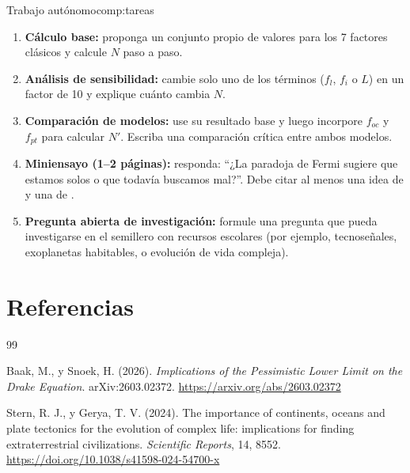 \documentclass[12pt,oneside]{book}
\begin{document}
\begin{compromiso}{Trabajo autónomo}{comp:tareas}
\begin{enumerate}[leftmargin=1.5em]
    \item \textbf{Cálculo base:} proponga un conjunto propio de valores para los 7 factores clásicos y calcule $N$ paso a paso.
    \item \textbf{Análisis de sensibilidad:} cambie solo uno de los términos ($f_l$, $f_i$ o $L$) en un factor de 10 y explique cuánto cambia $N$.
    \item \textbf{Comparación de modelos:} use su resultado base y luego incorpore $f_{oc}$ y $f_{pt}$ para calcular $N'$. Escriba una comparación crítica entre ambos modelos.
    \item \textbf{Miniensayo (1–2 páginas):} responda: \enquote{¿La paradoja de Fermi sugiere que estamos solos o que todavía buscamos mal?}. Debe citar al menos una idea de \cite{baak2026implicationspessimisticlowerlimit} y una de \cite{stern2024tectonics}.
    \item \textbf{Pregunta abierta de investigación:} formule una pregunta que pueda investigarse en el semillero con recursos escolares (por ejemplo, tecnoseñales, exoplanetas habitables, o evolución de vida compleja).
\end{enumerate}
\end{compromiso}

\backmatter
\chapter*{Referencias}

\begin{thebibliography}{99}

Baak, M., y Snoek, H. (2026).
\textit{Implications of the Pessimistic Lower Limit on the Drake Equation}.
arXiv:2603.02372.
\url{https://arxiv.org/abs/2603.02372}

Stern, R. J., y Gerya, T. V. (2024).
The importance of continents, oceans and plate tectonics for the evolution of complex life:
implications for finding extraterrestrial civilizations.
\textit{Scientific Reports}, 14, 8552.
\url{https://doi.org/10.1038/s41598-024-54700-x}

\end{thebibliography}
\end{document}
